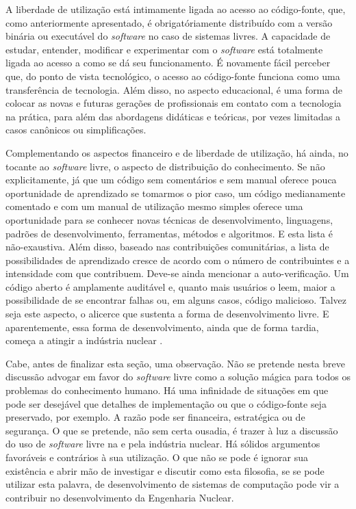 A liberdade de utilização está intimamente ligada ao acesso ao código-fonte, que, como anteriormente apresentado,
é obrigatóriamente distribuído com a versão binária ou executável do \textit{software} no caso de sistemas
livres. A capacidade de estudar, entender, modificar e experimentar
com o \textit{software} está totalmente ligada ao acesso a como se dá seu funcionamento. É novamente fácil perceber que,
do ponto de vista tecnológico, o acesso ao código-fonte funciona como uma transferência de tecnologia. Além disso, no
aspecto educacional, é uma forma de colocar as novas e futuras gerações de profissionais em contato com a tecnologia na
prática, para além das abordagens didáticas e teóricas, por vezes limitadas a casos canônicos ou simplificações. 



Complementando os aspectos financeiro e de liberdade de utilização, há ainda, no tocante ao \textit{software} livre,
o aspecto de distribuição do conhecimento. Se não explicitamente, já que um código sem comentários e sem manual oferece
pouca oportunidade de aprendizado se tomarmos o pior caso, um código medianamente comentado e com um manual de utilização mesmo
simples oferece uma oportunidade para se conhecer novas técnicas de desenvolvimento, linguagens, padrões de desenvolvimento, ferramentas,
métodos e algoritmos. E esta lista é não-exaustiva. Além disso, baseado nas contribuições comunitárias, a lista de possibilidades
de aprendizado cresce de acordo com o número de contribuintes e a intensidade com que contribuem. Deve-se ainda mencionar
a auto-verificação. Um código aberto é amplamente auditável e, quanto mais usuários o leem, maior a possibilidade de se
encontrar falhas ou, em alguns casos, código malicioso. Talvez seja este aspecto, o alicerce que sustenta a forma de desenvolvimento
livre. E aparentemente, essa forma de desenvolvimento, ainda que de forma tardia, começa a atingir a indústria nuclear
\cite{Romano2013, Boyd2014, Theler2014b, Huff2016}.


Cabe, antes de finalizar esta seção, uma observação. Não se pretende nesta breve discussão advogar em favor do \textit{software}
livre como a solução mágica para todos os problemas do conhecimento humano. Há uma infinidade de situações em que pode ser desejável
que detalhes de implementação ou que o código-fonte seja preservado, por exemplo. A razão pode ser financeira, estratégica ou de segurança.
O que se pretende, não sem certa ousadia, é trazer à luz a discussão do uso de \textit{software} livre na e pela indústria nuclear. Há sólidos
argumentos favoráveis e contrários à sua utilização. O que não se pode é ignorar sua existência e abrir mão de investigar e discutir como
esta filosofia, se se pode utilizar esta palavra, de desenvolvimento de sistemas de computação pode vir a contribuir no desenvolvimento
da Engenharia Nuclear.

